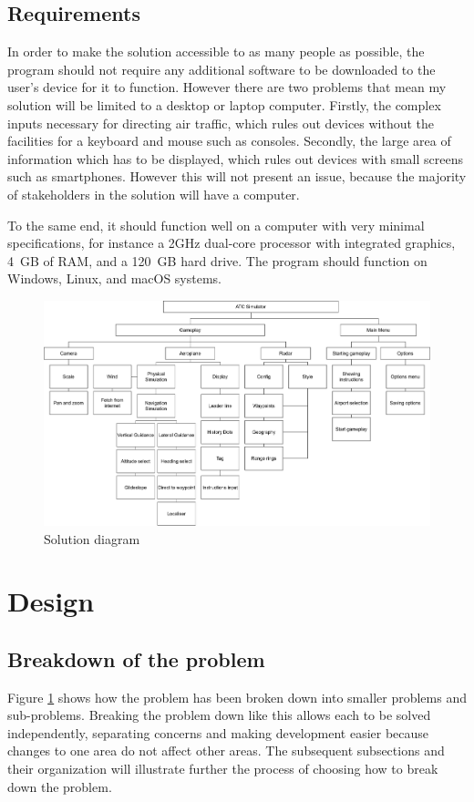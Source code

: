 \documentclass{article}
\begin{document}
\subsection{Requirements}
In order to make the solution accessible to as many people as possible, the program should not require any additional software to be downloaded to the user's device for it to function.
However there are two problems that mean my solution will be limited to a desktop or laptop computer.
Firstly, the complex inputs necessary for directing air traffic, which rules out devices without the facilities for a keyboard and mouse such as consoles.
Secondly, the large area of information which has to be displayed, which rules out devices with small screens such as smartphones.
However this will not present an issue, because the majority of stakeholders in the solution will have a computer.

To the same end, it should function well on a computer with very minimal specifications, for instance a 2GHz dual-core processor with integrated graphics, 4 GB of RAM, and a 120 GB hard drive.
The program should function on Windows, Linux, and macOS systems.
\clearpage

\begin{figure}
    \includegraphics[width=\textwidth]{diagrams/problemdiagram.png}
    \caption{\label{fig:solution_diagram}Solution diagram}
\end{figure}

\clearpage

\section{Design} \label{design}
\subsection{Breakdown of the problem}
Figure \ref{fig:solution_diagram} shows how the problem has been broken down into smaller problems and sub-problems.
Breaking the problem down like this allows each to be solved independently, separating concerns and making development easier because changes to one area do not affect other areas.
The subsequent subsections and their organization will illustrate further the process of choosing how to break down the problem.
\end{document}
